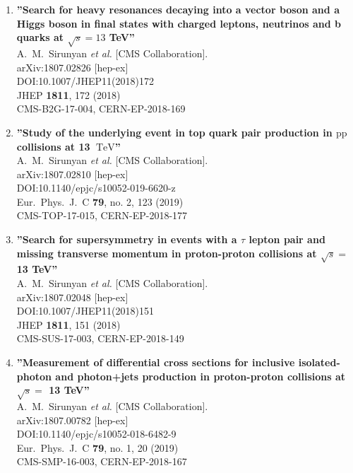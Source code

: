 \begin{enumerate}
\item%
{\bf ''Search for heavy resonances decaying into a vector boson and a Higgs boson in final states with charged leptons, neutrinos and b quarks at $ \sqrt{s}=13 $ TeV''}
  \\{}A.~M.~Sirunyan {\it et al.} [CMS Collaboration].
  \\{}arXiv:1807.02826 [hep-ex]
  \\{}DOI:10.1007/JHEP11(2018)172
  \\{}JHEP {\bf 1811}, 172 (2018)
  \\{}CMS-B2G-17-004, CERN-EP-2018-169

\item%
{\bf ''Study of the underlying event in top quark pair production in $\mathrm {p}\mathrm {p}$ collisions at 13 $~\text {Te}\text {V}$''}
  \\{}A.~M.~Sirunyan {\it et al.} [CMS Collaboration].
  \\{}arXiv:1807.02810 [hep-ex]
  \\{}DOI:10.1140/epjc/s10052-019-6620-z
  \\{}Eur.\ Phys.\ J.\ C {\bf 79}, no. 2, 123 (2019)
  \\{}CMS-TOP-17-015, CERN-EP-2018-177

\item%
{\bf ''Search for supersymmetry in events with a $\tau$ lepton pair and missing transverse momentum in proton-proton collisions at $\sqrt{s} =$ 13 TeV''}
  \\{}A.~M.~Sirunyan {\it et al.} [CMS Collaboration].
  \\{}arXiv:1807.02048 [hep-ex]
  \\{}DOI:10.1007/JHEP11(2018)151
  \\{}JHEP {\bf 1811}, 151 (2018)
  \\{}CMS-SUS-17-003, CERN-EP-2018-149

\item%
{\bf ''Measurement of differential cross sections for inclusive isolated-photon and photon+jets production in proton-proton collisions at $\sqrt{s} =$ 13 TeV''}
  \\{}A.~M.~Sirunyan {\it et al.} [CMS Collaboration].
  \\{}arXiv:1807.00782 [hep-ex]
  \\{}DOI:10.1140/epjc/s10052-018-6482-9
  \\{}Eur.\ Phys.\ J.\ C {\bf 79}, no. 1, 20 (2019)
  \\{}CMS-SMP-16-003, CERN-EP-2018-167


\end{enumerate}
